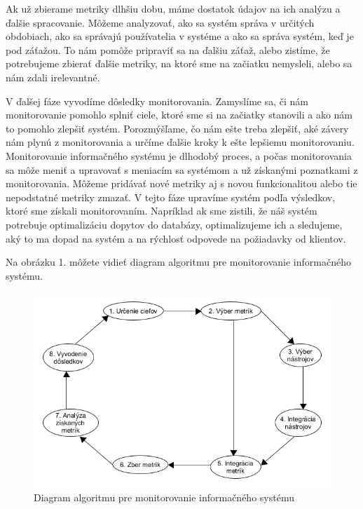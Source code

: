 \documentclass[a4paper, usesections, upjsfrontpage, thesismargins, thesislinespacing, twoside]{rnthesissvk}
\begin{document}
Ak už zbierame metriky dlhšiu dobu, máme dostatok údajov na ich analýzu a ďalšie spracovanie.
Môžeme analyzovať, ako sa systém správa v určitých obdobiach, ako sa správajú používatelia v systéme a ako sa správa systém, keď je pod záťažou. To nám pomôže pripraviť sa na ďalšiu záťaž, alebo zistíme, že potrebujeme zbierať ďalšie metriky, na ktoré sme na začiatku nemysleli, alebo sa nám zdali irelevantné.

V ďalšej fáze vyvodíme dôsledky monitorovania.
Zamyslíme sa, či nám monitorovanie pomohlo splniť ciele, ktoré sme si na začiatky stanovili a ako nám to pomohlo zlepšiť systém.
Porozmýšľame, čo nám ešte treba zlepšiť, aké závery nám plynú z monitorovania a určíme ďalšie kroky k ešte lepšiemu monitorovaniu.
Monitorovanie informačného systému je dlhodobý proces, a počas monitorovania sa môže meniť a upravovať s meniacím sa systémom a už získanými poznatkami z monitorovania.
Môžeme pridávať nové metriky aj s novou funkcionalitou alebo tie nepodstatné metriky zmazať.
V tejto fáze upravíme systém podľa výsledkov, ktoré sme získali monitorovaním.
Napríklad ak sme zistili, že náš systém potrebuje optimalizáciu dopytov do databázy, optimalizujeme ich a sledujeme, aký to ma dopad na systém a na rýchlosť odpovede na požiadavky od klientov.

Na obrázku 1. môžete vidieť diagram algoritmu pre monitorovanie informačného systému.

\begin{figure}
\begin{center}
\includegraphics[scale=0.41]{ais_algorithm.png}
\caption{Diagram algoritmu pre monitorovanie informačného systému}
\end{center}
\end{figure}
\end{document}
